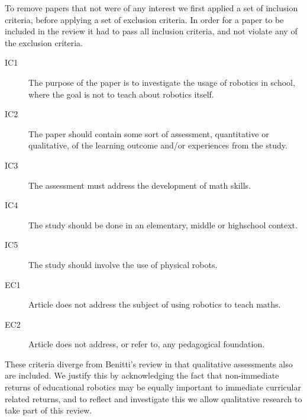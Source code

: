 \bigskip\noindent
To remove papers that not were of any interest we first applied a set of inclusion criteria, before applying a set of exclusion criteria. In order for a paper to be included in the review it had to pass all inclusion criteria, and not violate any of the exclusion criteria. 

\begin{description}
	\item[IC1] The purpose of the paper is to investigate the usage of robotics in school, where the goal is not to teach about robotics itself.
	\item[IC2] The paper should contain some sort of assessment, quantitative or qualitative, of the learning outcome and/or experiences from the study. 
	\item[IC3] The assessment must address the development of math skills. 
	\item[IC4] The study should be done in an elementary, middle or highschool context.
	\item[IC5] The study should involve the use of physical robots.
	\item[EC1] Article does not address the subject of using robotics to teach maths. 
	\item[EC2] Article does not address, or refer to, any pedagogical foundation. 
\end{description}
These criteria diverge from Benitti's review in that qualitative assessments also are included. 
We justify this by acknowledging the fact that non-immediate returns of educational robotics may be equally important to immediate curricular related returns,
and to reflect and investigate this we allow qualitative research to take part of this review. 	




